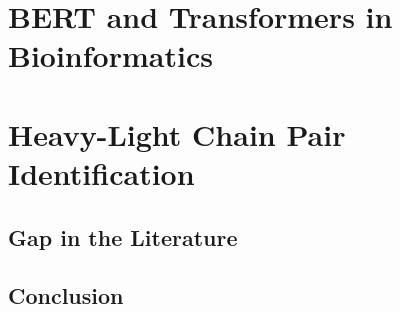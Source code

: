 \section{BERT and Transformers in Bioinformatics}




\section{Heavy-Light Chain Pair Identification}



\subsection{Gap in the Literature}




\subsection{Conclusion}


